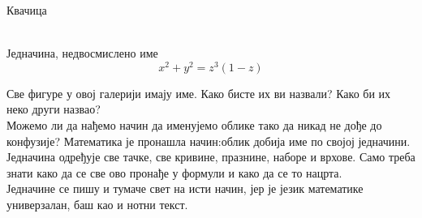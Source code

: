 \documentclass[en]{./../../common/SurferDesc}%
\begin{document}
\footnotesize

 

\begin{surferPage}
  \begin{surferTitle}Квачица\end{surferTitle}  \\
Једначина, недвосмислено име \\
\smallskip
\[x^2 + y^2	= z^3	(1 - z) \]


\singlespacing
Све фигуре у овој галерији имају име. Како бисте их ви назвали? Како би их неко други назвао?\\
\vspace{0.3cm}
Можемо ли да нађемо начин да именујемо облике тако да никад не дође до конфузије? Математика је пронашла начин:облик добија име по својој једначини. Једначина одређује све тачке, све кривине, празнине, наборе и врхове. Само треба знати како да се све ово пронађе у формули и како да се то нацрта.\\
\vspace{0.3cm}
Једначине се пишу и тумаче свет на исти начин, јер је језик математике универзалан, баш као и нотни текст. 

  \begin{surferText}
     \end{surferText}
\end{surferPage}
\end{document}
